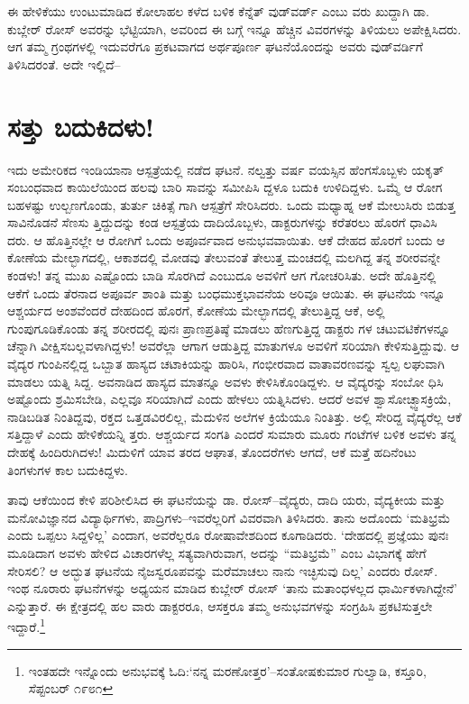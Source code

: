 ಈ ಹೇಳಿಕೆಯು ಉಂಟುಮಾಡಿದ ಕೋಲಾಹಲ ಕಳೆದ ಬಳಿಕ ಕೆನ್ನೆತ್ ವುಡ್​ವರ್ಡ್ ಎಂಬು ವರು ಖುದ್ದಾಗಿ ಡಾ. ಕುಬ್ಲೇರ್ ರೋಸ್ ಅವರನ್ನು ಭೆಟ್ಟಿಯಾಗಿ, ಅವರಿಂದ ಈ ಬಗ್ಗೆ ಇನ್ನೂ ಹೆಚ್ಚಿನ ವಿವರಗಳನ್ನು ತಿಳಿಯಲು ಅಪೇಕ್ಷಿಸಿದರು. ಆಗ ತಮ್ಮ ಗ್ರಂಥಗಳಲ್ಲಿ ಇದುವರೆಗೂ ಪ್ರಕಟವಾಗದ ಅರ್ಥಪೂರ್ಣ ಘಟನೆಯೊಂದನ್ನು ಅವರು ವುಡ್​ವರ್ಡಿಗೆ ತಿಳಿಸಿದರಂತೆ. ಅದೇ ಇಲ್ಲಿದೆ–


\section{ಸತ್ತು ಬದುಕಿದಳು!}

ಇದು ಅಮೇರಿಕದ ಇಂಡಿಯಾನಾ ಆಸ್ಪತ್ರೆಯಲ್ಲಿ ನಡೆದ ಘಟನೆ. ನಲ್ವತ್ತು ವರ್ಷ ವಯಸ್ಸಿನ ಹೆಂಗಸೊಬ್ಬಳು ಯಕೃತ್ ಸಂಬಂಧವಾದ ಕಾಯಿಲೆಯಿಂದ ಹಲವು ಬಾರಿ ಸಾವನ್ನು ಸಮೀಪಿಸಿ ದ್ದಳೂ ಬದುಕಿ ಉಳಿದಿದ್ದಳು. ಒಮ್ಮೆ ಆ ರೋಗ ಬಹಳಷ್ಟು ಉಲ್ಬಣಗೊಂಡು, ತುರ್ತು ಚಿಕಿತ್ಸೆ ಗಾಗಿ ಆಸ್ಪತ್ರೆಗೆ ಸೇರಿಸಿದರು. ಒಂದು ಮಧ್ಯಾಹ್ನ ಆಕೆ ಮೇಲುಸಿರು ಬಿಡುತ್ತ ಸಾವಿನೊಡನೆ ಸೆಣಸು ತ್ತಿದ್ದುದನ್ನು ಕಂಡ ಆಸ್ಪತ್ರೆಯ ದಾದಿಯೊಬ್ಬಳು, ಡಾಕ್ಟರುಗಳನ್ನು ಕರೆತರಲು ಹೊರಗೆ ಧಾವಿಸಿ ದರು. ಆ ಹೊತ್ತಿನಲ್ಲೇ ಆ ರೋಗಿಗೆ ಒಂದು ಅಪೂರ್ವವಾದ ಅನುಭವವಾಯಿತು. ಆಕೆ ದೇಹದ ಹೊರಗೆ ಬಂದು ಆ ಕೋಣೆಯ ಮೇಲ್ಭಾಗದಲ್ಲಿ, ಆಕಾಶದಲ್ಲಿ ಮೋಡವು ತೇಲುವಂತೆ ತೇಲುತ್ತ ಮಂಚದಲ್ಲಿ ಮಲಗಿದ್ದ ತನ್ನ ಶರೀರವನ್ನೇ ಕಂಡಳು! ತನ್ನ ಮುಖ ಎಷ್ಟೊಂದು ಬಾಡಿ ಸೊರಗಿದೆ ಎಂಬುದೂ ಅವಳಿಗೆ ಆಗ ಗೋಚರಿಸಿತು. ಅದೇ ಹೊತ್ತಿನಲ್ಲಿ ಆಕೆಗೆ ಒಂದು ತೆರನಾದ ಅಪೂರ್ವ ಶಾಂತಿ ಮತ್ತು ಬಂಧಮುಕ್ತಭಾವನೆಯ ಅರಿವೂ ಆಯಿತು. ಈ ಘಟನೆಯ ಇನ್ನೂ ಆಶ್ಚರ್ಯದ ಅಂಶವೆಂದರೆ ದೇಹದಿಂದ ಹೊರಗೆ, ಕೋಣೆಯ ಮೇಲ್ಭಾಗದಲ್ಲಿ ತೇಲುತ್ತಿದ್ದ ಆಕೆ, ಅಲ್ಲಿ ಗುಂಪುಗೂಡಿಕೊಂಡು ತನ್ನ ಶರೀರದಲ್ಲಿ ಪುನಃ ಪ್ರಾಣಪ್ರತಿಷ್ಠೆ ಮಾಡಲು ಹೆಣಗುತ್ತಿದ್ದ ಡಾಕ್ಟರು ಗಳ ಚಟುವಟಿಕೆಗಳನ್ನೂ ಚೆನ್ನಾಗಿ ವೀಕ್ಷಿಸಬಲ್ಲವಳಾಗಿದ್ದಳು! ಅವರೆಲ್ಲಾ ಆಗಾಗ ಆಡುತ್ತಿದ್ದ ಮಾತುಗಳೂ ಅವಳಿಗೆ ಸರಿಯಾಗಿ ಕೇಳಿಸುತ್ತಿದ್ದುವು. ಆ ವೈದ್ಯರ ಗುಂಪಿನಲ್ಲಿದ್ದ ಒಬ್ಬಾತ ಹಾಸ್ಯದ ಚಟಾಕಿಯನ್ನು ಹಾರಿಸಿ, ಗಂಭೀರವಾದ ವಾತಾವರಣವನ್ನು ಸ್ವಲ್ಪ ಲಘುವಾಗಿ ಮಾಡಲು ಯತ್ನಿ ಸಿದ್ದ. ಅವನಾಡಿದ ಹಾಸ್ಯದ ಮಾತನ್ನೂ ಅವಳು ಕೇಳಿಸಿಕೊಂಡಿದ್ದಳು. ಆ ವೈದ್ಯರನ್ನು ಸಂಬೋ ಧಿಸಿ ಅಷ್ಟೊಂದು ಶ್ರಮಿಸಬೇಡಿ, ಎಲ್ಲವೂ ಸರಿಯಾಗಿದೆ ಎಂದು ಹೇಳಲು ಯತ್ನಿಸಿದಳು. ಆದರೆ ಅವಳ ಶ್ವಾಸೋಚ್ಛ್ವಾಸಕ್ರಿಯೆ, ನಾಡಿಬಡಿತ ನಿಂತಿದ್ದವು, ರಕ್ತದ ಒತ್ತಡವಿರಲಿಲ್ಲ, ಮೆದುಳಿನ ಅಲೆಗಳ ಕ್ರಿಯೆಯೂ ನಿಂತಿತ್ತು. ಅಲ್ಲಿ ಸೇರಿದ್ದ ವೈದ್ಯರೆಲ್ಲ ಆಕೆ ಸತ್ತಿದ್ದಾಳೆ ಎಂದು ಹೇಳಿಕೆಯನ್ನಿ ತ್ತರು. ಆಶ್ಚರ್ಯದ ಸಂಗತಿ ಎಂದರೆ ಸುಮಾರು ಮೂರು ಗಂಟೆಗಳ ಬಳಿಕ ಅವಳು ತನ್ನ ದೇಹಕ್ಕೆ ಹಿಂದಿರುಗಿದಳು! ಮಿದುಳಿಗೆ ಯಾವ ತರದ ಆಘಾತ, ತೊಂದರೆಗಳು ಆಗದೆ, ಆಕೆ ಮತ್ತೆ ಹದಿನೆಂಟು ತಿಂಗಳುಗಳ ಕಾಲ ಬದುಕಿದ್ದಳು.

ತಾವು ಆಕೆಯಿಂದ ಕೇಳಿ ಪರಿಶೀಲಿಸಿದ ಈ ಘಟನೆಯನ್ನು ಡಾ. ರೋಸ್​–ವೈದ್ಯರು, ದಾದಿ ಯರು, ವೈದ್ಯಕೀಯ ಮತ್ತು ಮನೋವಿಜ್ಞಾನದ ವಿದ್ಯಾರ್ಥಿಗಳು, ಪಾದ್ರಿಗಳು–ಇವರೆಲ್ಲರಿಗೆ ವಿವರವಾಗಿ ತಿಳಿಸಿದರು. ತಾನು ಅದೊಂದು ‘ಮತಿಭ್ರಮೆ ಎಂದು ಒಪ್ಪಲು ಸಿದ್ದಳಿಲ್ಲ’ ಎಂದಾಗ, ಅವರೆಲ್ಲರೂ ರೋಷಾವೇಶದಿಂದ ಕೂಗಾಡಿದರು. ‘ದೇಹದಲ್ಲಿ ಪ್ರಜ್ಞೆಯು ಪುನಃ ಮೂಡಿದಾಗ ಅವಳು ಹೇಳಿದ ವಿಚಾರಗಳೆಲ್ಲ ಸತ್ಯವಾಗಿರುವಾಗ, ಅದನ್ನು “ಮತಿಭ್ರಮೆ” ಎಂಬ ವಿಭಾಗಕ್ಕೆ ಹೇಗೆ ಸೇರಿಸಲಿ? ಆ ಅದ್ಭುತ ಘಟನೆಯ ನೈಜಸ್ವರೂಪವನ್ನು ಮರೆಮಾಚಲು ನಾನು ಇಚ್ಛಿಸುವು ದಿಲ್ಲ’ ಎಂದರು ರೋಸ್. ಇಂಥ ನೂರಾರು ಘಟನೆಗಳನ್ನು ಅಧ್ಯಯನ ಮಾಡಿದ ಕುಬ್ಲೇರ್ ರೋಸ್ ‘ತಾನು ಮತಾಂಧಳಲ್ಲದ ಧಾರ್ಮಿಕಳಾಗಿದ್ದೇನೆ’ ಎನ್ನುತ್ತಾರೆ. ಈ ಕ್ಷೇತ್ರದಲ್ಲಿ ಹಲ ವಾರು ಡಾಕ್ಟರರೂ, ಆಸಕ್ತರೂ ತಮ್ಮ ಅನುಭವಗಳನ್ನು ಸಂಗ್ರಹಿಸಿ ಪ್ರಕಟಿಸುತ್ತಲೇ ಇದ್ದಾರೆ.\footnote{ ಇಂತಹದೇ ಇನ್ನೊಂದು ಅನುಭವಕ್ಕೆ ಓದಿ:‘ನನ್ನ ಮರಣೋತ್ತರ’–ಸಂತೋಷಕುಮಾರ ಗುಲ್ವಾಡಿ, ಕಸ್ತೂರಿ, ಸೆಪ್ಟಂಬರ್ ೧೯೮೧}

